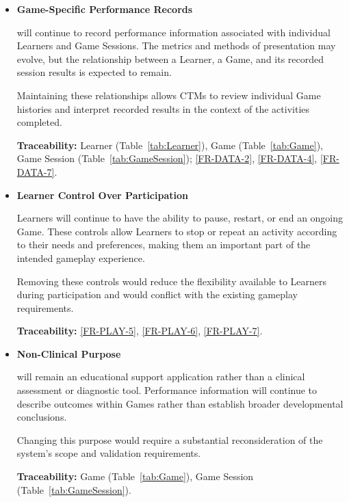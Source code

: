 \documentclass[12pt]{article}
\newcounter{lcnum} %
\begin{document}
\begin{itemize}
\item[ULC\refstepcounter{ulcnum}\arabic{ulcnum}
  \label{ULC_PerformanceRecords}:] \textbf{Game-Specific Performance Records}

\progname{} will continue to record performance information associated with
individual Learners and Game Sessions. The metrics and methods of presentation
may evolve, but the relationship between a Learner, a Game, and its recorded
session results is expected to remain.

Maintaining these relationships allows CTMs to review individual Game histories
and interpret recorded results in the context of the activities completed.

\textbf{Traceability:} Learner (Table~\ref{tab:Learner}), Game
(Table~\ref{tab:Game}), Game Session (Table~\ref{tab:GameSession});
\ref{FR-DATA-2}, \ref{FR-DATA-4}, \ref{FR-DATA-7}.

\item[ULC\refstepcounter{ulcnum}\arabic{ulcnum}
  \label{ULC_Participation}:] \textbf{Learner Control Over Participation}

Learners will continue to have the ability to pause, restart, or end an ongoing
Game. These controls allow Learners to stop or repeat an activity according to
their needs and preferences, making them an important part of the intended
gameplay experience.

Removing these controls would reduce the flexibility available to Learners
during participation and would conflict with the existing gameplay requirements.

\textbf{Traceability:} \ref{FR-PLAY-5}, \ref{FR-PLAY-6}, \ref{FR-PLAY-7}.

\item[ULC\refstepcounter{ulcnum}\arabic{ulcnum}
  \label{ULC_NonClinicalPurpose}:] \textbf{Non-Clinical Purpose}

\progname{} will remain an educational support application rather than a
clinical assessment or diagnostic tool. Performance information will continue to
describe outcomes within Games rather than establish broader developmental
conclusions.

Changing this purpose would require a substantial reconsideration of the
system's scope and validation requirements.

\textbf{Traceability:} Game (Table~\ref{tab:Game}), Game Session
(Table~\ref{tab:GameSession}).

\end{itemize}
\end{document}
